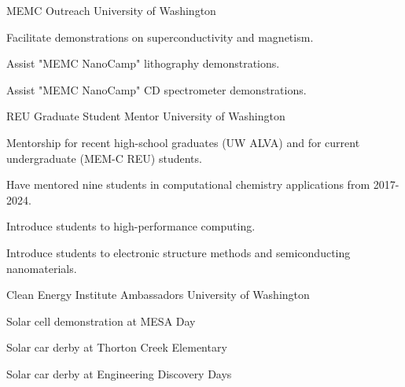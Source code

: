 

\begin{cventries}

\cventry
  {}
  {MEMC Outreach} %
  {University of Washington} %
  {}
  {
    \begin{cvitems}
      \item{Facilitate demonstrations on superconductivity and magnetism.}
      \item{Assist "MEMC NanoCamp" lithography demonstrations.}
      \item{Assist "MEMC NanoCamp" CD spectrometer demonstrations.}
    \end{cvitems}
  }

\cventry
  {}
  {REU Graduate Student Mentor} %
  {University of Washington} %
  {}
  {
    \begin{cvitems}
      \item{Mentorship for recent high-school graduates (UW ALVA) and for current undergraduate (MEM-C REU) students.}
      \item{Have mentored nine students in computational chemistry applications from 2017-2024.}
      \item{Introduce students to high-performance computing.}
      \item{Introduce students to electronic structure methods and semiconducting nanomaterials.}
    \end{cvitems}
  }

\cventry
  {}
  {Clean Energy Institute Ambassadors} %
  {University of Washington} %
  {}
  {
    \begin{cvitems}
      \item{Solar cell demonstration at MESA Day}
      \item{Solar car derby at Thorton Creek Elementary}
      \item{Solar car derby at Engineering Discovery Days}
    \end{cvitems}
  }


\end{cventries}
